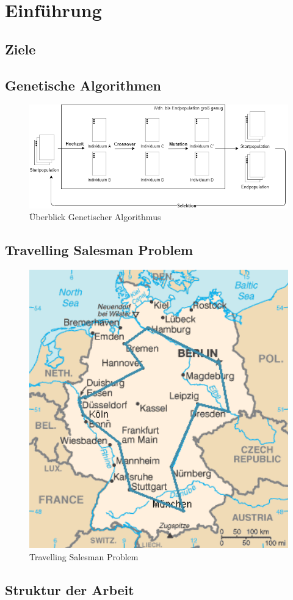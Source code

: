 
\section{Einführung}

\subsection{Ziele}

\subsection{Genetische Algorithmen}
\begin{figure}[H]
\centering
\includegraphics[width=1\textwidth]{img/Vortrag/Genetic_Algorithm.png}
\caption{Überblick Genetischer Algorithmus}
\label{fig:genetic_algorithm}
\end{figure}

\subsection{Travelling Salesman Problem}
\begin{figure}[H]
\centering
\includegraphics[width=1\textwidth]{img/Vortrag/TSP_Deutschland.png}
\caption{Travelling Salesman Problem}
\label{fig:TSP}
\end{figure}

\subsection{Struktur der Arbeit}

